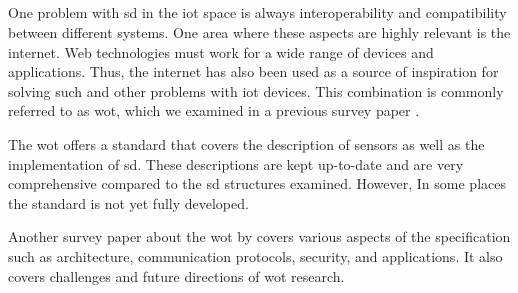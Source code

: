 \subsection{}\label{sec:wot}

One problem with \gls{sd} in the \gls{iot} space is always interoperability and compatibility between different systems. One area where these aspects are highly relevant is the internet. Web technologies must work for a wide range of devices and applications. Thus, the internet has also been used as a source of inspiration for solving such and other problems with \gls{iot} devices. This combination is commonly referred to as \gls{wot}, which we examined in a previous survey paper \autocite{Survey.Service.Discovery.in.Smart.Cities}.

The \gls{wot} offers a standard that covers the description of sensors as well as the implementation of \gls{sd}. These descriptions are kept up-to-date and are very comprehensive compared to the \gls{sd} structures examined. However, In some places the standard is not yet fully developed.

Another survey paper about the \gls{wot} by \citeauthor{Sciullo.2022.ASotWoT} \autocite{Sciullo.2022.ASotWoT} covers various aspects of the specification such as architecture, communication protocols, security, and applications. It also covers challenges and future directions of \gls{wot} research.
